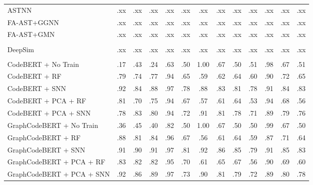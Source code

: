 \documentclass[final,5p,times,twocolumn]{elsarticle}
\theoremstyle{plain}
\begin{document}
\begin{table}[!htbp]
\begin{adjustbox}{
    max width=\columnwidth,
    max totalheight=1.0\textheight,
    keepaspectratio,
    center
}
\begin{tabular}{@{}l*{12}{c}@{}}
ASTNN
& .xx & .xx & .xx & .xx
& .xx & .xx & .xx & .xx
& .xx & .xx & .xx & .xx \\

FA-AST+GGNN
& .xx & .xx & .xx & .xx
& .xx & .xx & .xx & .xx
& .xx & .xx & .xx & .xx \\

FA-AST+GMN
& .xx & .xx & .xx & .xx
& .xx & .xx & .xx & .xx
& .xx & .xx & .xx & .xx \\

\rowcolor{black!7}
\multicolumn{13}{@{}l}{\textit{Hybrid graph + code baseline}}\\[0pt]

DeepSim
& .xx & .xx & .xx & .xx
& .xx & .xx & .xx & .xx
& .xx & .xx & .xx & .xx \\

\rowcolor{black!7}
\multicolumn{13}{@{}l}{\textit{Pretrained code models}}\\[0pt]

CodeBERT + No Train
& .17 & .43 & .24 & .63
& .50 & 1.00 & .67 & .50
& .51 & .98 & .67 & .51 \\

CodeBERT + RF
& .79 & .74 & .77 & .94
& .65 & .59 & .62 & .64
& .60 & .90 & .72 & .65 \\

CodeBERT + SNN
& .92 & .84 & .88 & .97
& .78 & .88 & .83 & .81
& .78 & .91 & .84 & .83 \\

CodeBERT + PCA + RF
& .81 & .70 & .75 & .94
& .67 & .57 & .61 & .64
& .53 & .94 & .68 & .56 \\

CodeBERT + PCA + SNN
& .78 & .83 & .80 & .94
& .72 & .91 & .81 & .78
& .71 & .89 & .79 & .76 \\

GraphCodeBERT + No Train
& .36 & .45 & .40 & .82
& .50 & 1.00 & .67 & .50
& .50 & .99 & .67 & .50 \\

GraphCodeBERT + RF
& .88 & .81 & .84 & .96
& .67 & .56 & .61 & .64
& .59 & .87 & .71 & .64 \\

GraphCodeBERT + SNN
& .91 & .90 & .91 & .97
& .81 & .92 & .86 & .85
& .79 & .91 & .85 & .83 \\

GraphCodeBERT + PCA + RF
& .83 & .82 & .82 & .95
& .70 & .61 & .65 & .67
& .56 & .90 & .69 & .60 \\

GraphCodeBERT + PCA + SNN
& .92 & .86 & .89 & .97
& .73 & .90 & .81 & .79
& .72 & .89 & .80 & .78 \\


\end{tabular}
\end{adjustbox}
\end{table}
\end{document}
